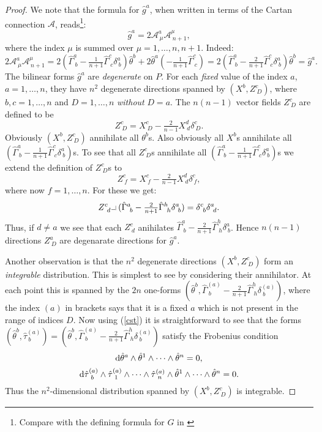 \documentclass[letterpaper]{amsart}
\theoremstyle{definition}
\theoremstyle{remark}
\newcommand{\dz}{\wedge}
\newcommand{\der}{{\rm d}}
\newcommand{\hook}{\raisebox{-0.35ex}{\makebox[0.6em][r]
{\scriptsize $-$}}\hspace{-0.15em}\raisebox{0.25ex}{\makebox[0.4em][l]{\tiny
 $|$}}}
\begin{document}
\begin{proof}
We note that the formula for $\hat{g}^a$, when written in terms of the
Cartan connection $\mathcal A$, reads\footnote{Compare with the defining formula
for $G$ in \cite{ns}}:
$$\hat{g}^a=2{\mathcal A}^a_{~\mu}{\mathcal A}^\mu_{~n+1},$$
where the index $\mu$ is summed over $\mu=1,\dots,n,n+1$. Indeed:
$$2{\mathcal A}^a_{~\mu}{\mathcal A}^\mu_{~n+1}=2(\hat{\Gamma}^a_{~b}-\tfrac{1}{n+1}\hat{\Gamma}^c_{~c}\delta^a_{~b})\hat{\theta}^b+2\hat{\theta}^a(-\tfrac{1}{n+1}\hat{\Gamma}^c_{~c})=2(\hat{\Gamma}^a_{~b}-\tfrac{2}{n+1}\hat{\Gamma}^c_{~c}\delta^a_{~b})\hat{\theta}^b=\hat{g}^a.$$
The bilinear forms $\hat{g}^a$ are \emph{degenerate} on $P$. For each
\emph{fixed} value
of the index $a$, $a=1,\dots,n$, they have $n^2$ degenerate directions
spanned by $(X^b,Z^c_{~D})$, where $b,c=1,\dots, n$ and $D=1,\dots, n$
\emph{without} $D=a$. The $n(n-1)$ vector fields $Z^c_{~D}$ are
defined to be
$$Z^c_{~D}=X^c_{~D}-\tfrac{2}{n-1}X^d_{~d}\delta^c_{~D}.$$  
Obviously $(X^b,Z^c_{~D})$ annihilate all $\theta^b$s. Also obviously
all $X^b$s annihilate all
$(\hat{\Gamma}^a_{~b}-\tfrac{1}{n+1}\hat{\Gamma}^c_{~c}\delta^a_{~b})$s. To
see that all $Z^c_{~D}$s annihilate all 
$(\hat{\Gamma}^a_{~b}-\tfrac{1}{n+1}\hat{\Gamma}^c_{~c}\delta^a_{~b})$s 
we extend the definition of $Z^c_{~D}$s to 
$$Z^c_{~f}=X^c_{~f}-\tfrac{2}{n-1}X^d_{~d}\delta^c_{~f},$$
where now $f=1,\dots, n$.
For these we get:
$$Z^c_{~d}\hook(\hat{\Gamma}^a_{~b}-\tfrac{2}{n+1}\hat{\Gamma}^h_{~h}\delta^a_{~b})=
\delta^c_{~b}\delta^a_{~d}.$$
Thus, if $d\neq a$ we see that each $Z^c_{~d}$ anihilates
$\hat{\Gamma}^a_{~b}-\tfrac{2}{n+1}\hat{\Gamma}^h_{~h}\delta^a_{~b}$. 
Hence $n(n-1)$ directions $Z^a_{~D}$ are degenarate directions for
$\hat{g}^a$.

Another observation is that the $n^2$ degenerate directions
$(X^b,Z^c_{~D})$ form an \emph{integrable} distribution. This is
simplest to see by considering their annihilator. At each point this
is spanned by the $2n$ one-forms
$(\hat{\theta}^b,\hat{\Gamma}^{(a)}_{~b}-\tfrac{2}{n+1}\hat{\Gamma}^h_{~h}\delta^{(a)}_{~b})$,
where the index $(a)$ in brackets says that it is a fixed $a$ which is
not present in the range of indices $D$. Now using (\ref{cst}) it is
straightforward to see that the forms
$(\hat{\theta}^b,\hat{\tau}^{(a)}_{~b})=(\hat{\theta}^b,\hat{\Gamma}^{(a)}_{~b}-\tfrac{2}{n+1}\hat{\Gamma}^h_{~h}\delta^{(a)}_{~b})$
satisfy the Frobenius condition
$$\der\hat{\theta}^a\dz\hat{\theta}^1\dz\dots\dz\hat{\theta}^n=0,$$
$$\der\hat{\tau}^{(a)}_{~b}\dz\hat{\tau}^{(a)}_{~1}\dz
\dots\dz\hat{\tau}^{(a)}_{~n}\dz\hat{\theta}^1\dz\dots\dz\hat{\theta}^n=0.$$
Thus the $n^2$-dimensional distribution spanned by $(X^b,Z^c_{~D})$ is
integrable.


\end{proof}
\end{document}
